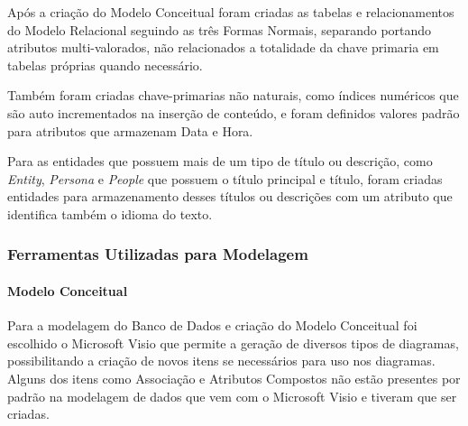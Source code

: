 \documentclass[12pt]{article}
\begin{document}
Após a criação do Modelo Conceitual foram criadas as tabelas e relacionamentos do Modelo Relacional seguindo as três Formas Normais, separando portando atributos multi-valorados, não relacionados a totalidade da chave primaria em tabelas próprias quando necessário.

Também foram criadas chave-primarias não naturais, como índices numéricos que são auto incrementados na inserção de conteúdo, e foram definidos valores padrão para atributos que armazenam Data e Hora.

Para as entidades que possuem mais de um tipo de título ou descrição, como \textit{Entity}, \textit{Persona} e \textit{People} que possuem o título principal e título, foram criadas entidades para armazenamento desses títulos ou descrições com um atributo que identifica também o idioma do texto.


\subsubsection{Ferramentas Utilizadas para Modelagem}

\paragraph{Modelo Conceitual\newline}

Para a modelagem do Banco de Dados e criação do Modelo Conceitual foi escolhido o Microsoft Visio que permite a geração de diversos tipos de diagramas, possibilitando a criação de novos itens se necessários para uso nos diagramas. Alguns dos itens como Associação e Atributos Compostos não estão presentes por padrão na modelagem de dados que vem com o Microsoft Visio e tiveram que ser criadas.
\end{document}
